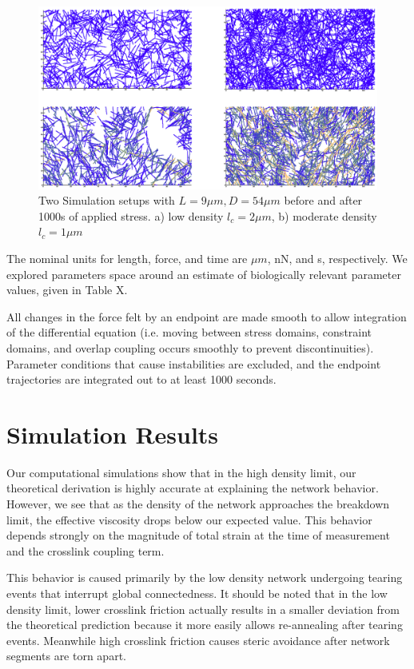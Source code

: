 \documentclass[prb,11pt]{revtex4-1}
\begin{document}
\begin{figure}[h!]
\centering
\includegraphics[width=\textwidth]{network_def}
\caption{\label{fig:sim}Two Simulation setups with $L=9 \mu m, D = 54 \mu m$ before and after 1000s of applied stress. a) low density $l_c=2 \mu m$, b) moderate density $l_c=1 \mu m$ }
\end{figure}

The nominal units for length, force, and time are $\mu m$, nN, and s, respectively.  We explored parameters space around an estimate of biologically relevant parameter values, given in Table X. 

All changes in the force felt by an endpoint are made smooth to allow integration of the differential equation (i.e. moving between stress domains, constraint domains, and overlap coupling occurs smoothly to prevent discontinuities).  Parameter conditions that cause instabilities are excluded, and the endpoint trajectories are integrated out to at least 1000 seconds. 


\section{Simulation Results}

Our computational simulations show that in the high density limit, our theoretical derivation is highly accurate at explaining the network behavior.  However, we see that as the density of the network approaches the breakdown limit, the effective viscosity drops below our expected value.  This behavior depends strongly on the magnitude of total strain at the time of measurement and the crosslink coupling term. 

This behavior is caused primarily by the low density network undergoing tearing events that interrupt global connectedness.  It should be noted that in the low density limit, lower crosslink friction actually results in a smaller deviation from the theoretical prediction because it more easily allows re-annealing after tearing events.  Meanwhile high crosslink friction causes steric avoidance after network segments are torn apart.
\end{document}
